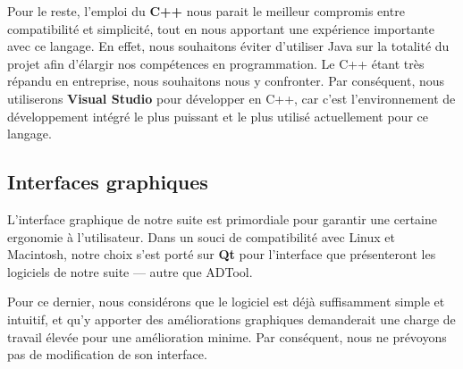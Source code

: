        	Pour le reste, l'emploi du {\bf C++} nous parait le meilleur compromis entre compatibilité et simplicité, tout en nous apportant une expérience importante avec ce langage. En effet, nous souhaitons éviter d'utiliser Java sur la totalité du projet afin d'élargir nos compétences en programmation. Le C++ étant très répandu en entreprise, nous souhaitons nous y confronter. Par conséquent, nous utiliserons {\bf Visual Studio} pour développer en C++, car c'est l'environnement de développement intégré le plus puissant et le plus utilisé actuellement pour ce langage.

    \subsection{Interfaces graphiques}
        L'interface graphique de notre suite est primordiale pour garantir une certaine ergonomie à l'utilisateur. Dans un souci de compatibilité avec Linux et Macintosh, notre choix s'est porté sur {\bf Qt} pour l'interface que présenteront les logiciels de notre suite --- autre que ADTool. 
        
        Pour ce dernier, nous considérons que le logiciel est déjà suffisamment simple et intuitif, et qu'y apporter des améliorations graphiques demanderait une charge de travail élevée pour une amélioration minime. Par conséquent, nous ne prévoyons pas de modification de son interface.
